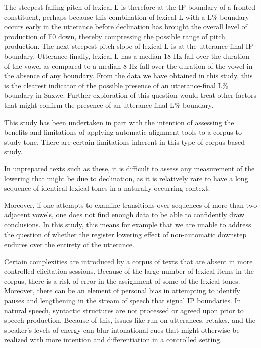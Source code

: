 \documentclass[
  11pt,
  b5paper,
]{article}
\begin{document}
The steepest falling pitch of lexical L is therefore at the IP boundary
of a fronted constituent, perhaps because this combination of lexical L
with a L\% boundary occurs early in the utterance before declination has
brought the overall level of production of F0 down, thereby compressing
the possible range of pitch production. The next steepest pitch slope of
lexical L is at the utterance-final IP boundary. Utterance-finally,
lexical L has a median 18 Hz fall over the duration of the vowel as
compared to a median 8 Hz fall over the duration of the vowel in the
absence of any boundary. From the data we have obtained in this study,
this is the clearest indicator of the possible presence of an
utterance-final L\% boundary in Saxwe. Further exploration of this
question would treat other factors that might confirm the presence of an
utterance-final L\% boundary.

This study has been undertaken in part with the intention of assessing
the benefits and limitations of applying automatic alignment tools to a
corpus to study tone. There are certain limitations inherent in this
type of corpus-based study.

In unprepared texts such as these, it is difficult to assess any
measurement of the lowering that might be due to declination, as it is
relatively rare to have a long sequence of identical lexical tones in a
naturally occurring context.

Moreover, if one attempts to examine transitions over sequences of more
than two adjacent vowels, one does not find enough data to be able to
confidently draw conclusions. In this study, this means for example that
we are unable to address the question of whether the register lowering
effect of non-automatic downstep endures over the entirety of the
utterance.

Certain complexities are introduced by a corpus of texts that are absent
in more controlled elicitation sessions. Because of the large number of
lexical items in the corpus, there is a risk of error in the assignment
of some of the lexical tones. Moreover, there can be an element of
personal bias in attempting to identify pauses and lengthening in the
stream of speech that signal IP boundaries. In natural speech, syntactic
structures are not processed or agreed upon prior to speech production.
Because of this, issues like run-on utterances, retakes, and the
speaker's levels of energy can blur intonational cues that might
otherwise be realized with more intention and differentiation in a
controlled setting.
\end{document}

